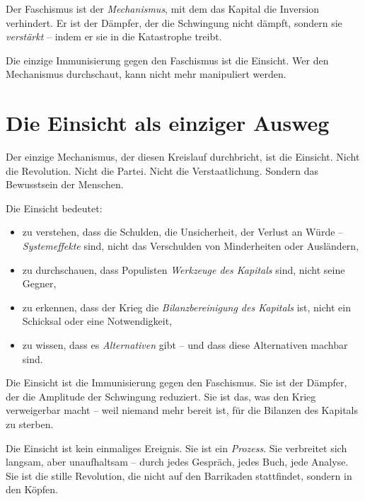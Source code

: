 \documentclass[12pt,a4paper]{book}
\begin{document}
Der Faschismus ist der \emph{Mechanismus}, mit dem das Kapital die Inversion verhindert. Er ist der Dämpfer, der die Schwingung nicht dämpft, sondern sie \emph{verstärkt} – indem er sie in die Katastrophe treibt.

Die einzige Immunisierung gegen den Faschismus ist die Einsicht. Wer den Mechanismus durchschaut, kann nicht mehr manipuliert werden.

\chapter{Die Einsicht als einziger Ausweg}

Der einzige Mechanismus, der diesen Kreislauf durchbricht, ist die Einsicht. Nicht die Revolution. Nicht die Partei. Nicht die Verstaatlichung. Sondern das Bewusstsein der Menschen.

Die Einsicht bedeutet:

\begin{itemize}
    \item zu verstehen, dass die Schulden, die Unsicherheit, der Verlust an Würde – \emph{Systemeffekte} sind, nicht das Verschulden von Minderheiten oder Ausländern,
    \item zu durchschauen, dass Populisten \emph{Werkzeuge des Kapitals} sind, nicht seine Gegner,
    \item zu erkennen, dass der Krieg die \emph{Bilanzbereinigung des Kapitals} ist, nicht ein Schicksal oder eine Notwendigkeit,
    \item zu wissen, dass es \emph{Alternativen} gibt – und dass diese Alternativen machbar sind.
\end{itemize}

Die Einsicht ist die Immunisierung gegen den Faschismus. Sie ist der Dämpfer, der die Amplitude der Schwingung reduziert. Sie ist das, was den Krieg verweigerbar macht – weil niemand mehr bereit ist, für die Bilanzen des Kapitals zu sterben.

Die Einsicht ist kein einmaliges Ereignis. Sie ist ein \emph{Prozess}. Sie verbreitet sich langsam, aber unaufhaltsam – durch jedes Gespräch, jedes Buch, jede Analyse. Sie ist die stille Revolution, die nicht auf den Barrikaden stattfindet, sondern in den Köpfen.

\end{document}
